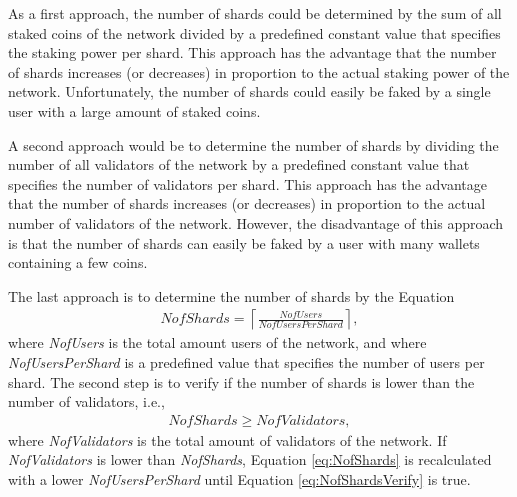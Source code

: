 As a first approach, the number of shards could be determined by the sum of all staked coins of the network divided by a predefined constant value that specifies the staking power per shard. This approach has the advantage that the number of shards increases (or decreases) in proportion to the actual staking power of the network. Unfortunately, the number of shards could easily be faked by a single user with a large amount of staked coins. 

A second approach would be to determine the number of shards by dividing the number of all validators of the network by a predefined constant value that specifies the number of validators per shard. This approach has the advantage that the number of shards increases (or decreases) in proportion to the actual number of validators of the network. However, the disadvantage of this approach is that the number of shards can easily be faked by a user with many wallets containing a few coins.

The last approach is to determine the number of shards by the Equation
\begin{gather}
\label{eq:NofShards}
  NofShards = \left\lceil \frac{NofUsers}{NofUsersPerShard} \right\rceil,
\end{gather}
where \textit{NofUsers} is the total amount users of the network, and where \textit{NofUsersPerShard} is a predefined value that specifies the number of users per shard. The second step is to verify if the number of shards is lower than the number of validators, i.e., 
\begin{gather}
\label{eq:NofShardsVerify}
  NofShards \geq NofValidators,
\end{gather}
where \textit{NofValidators} is the total amount of validators of the network. If \textit{NofValidators} is lower than \textit{NofShards}, Equation \ref{eq:NofShards} is recalculated with a lower \textit{NofUsersPerShard} until Equation \ref{eq:NofShardsVerify} is true. 

